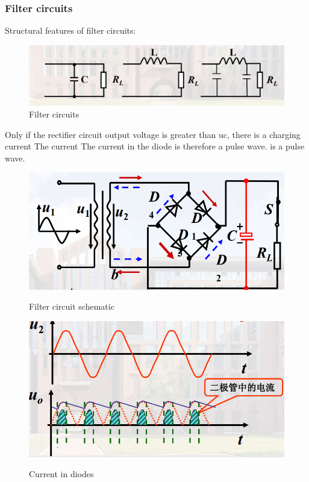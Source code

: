 \documentclass[UTF8]{article}
\begin{document}
  \subsubsection{Filter circuits}
  Structural features of filter circuits:
    	\begin{figure}[H]
    	    	\centering
    	    	\includegraphics[clip,scale=0.65,trim={0 0 0 0}]{fig/fig10.png}
    	        \caption{Filter circuits}
    	        \label{figure.10}
        \end{figure}  
   Only if the rectifier circuit output voltage is greater than uc, there is a charging current The current The current in the diode is therefore a pulse wave. is a pulse wave.     
       
    \begin{figure}[H]
       \begin{minipage}[t]{0.6\linewidth}
          \centering
          \includegraphics[clip,scale=0.6,trim={0 0 0 0}]{fig/fig11.png}
          \label{figure.11}
          \caption{Filter circuit schematic}
       \end{minipage}
       \begin{minipage}[t]{0.45\linewidth}
          \centering
          \includegraphics[clip,scale=0.55,trim={0 0 10 0}]{fig/fig12.png}
          \label{figure.12}
          \caption{Current in diodes}
       \end{minipage}   	  
    \end{figure}  
    
\end{document}
